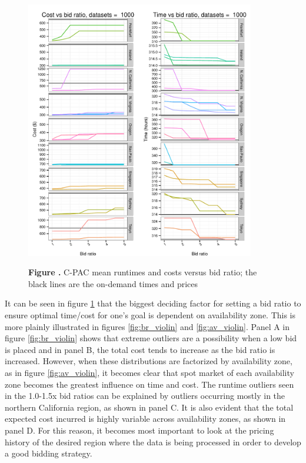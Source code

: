 \documentclass{frontiersSCNS} %
\begin{document}
\begin{figure}[!ht]
\begin{center}
\includegraphics[width=10cm]{../../spot-model/plots/cpac_sim_mean.pdf}
\end{center}
 \textbf{\label{fig:02} Figure .}{ C-PAC mean runtimes and costs versus bid ratio; the black lines are the on-demand times and prices }
\end{figure}

It can be seen in figure \ref{fig:02} that the biggest deciding factor for setting a bid ratio to ensure optimal time/cost for one's goal is dependent on availability zone. This is more plainly illustrated in figures \ref{fig:br_violin} and \ref{fig:av_violin}. Panel A in figure \ref{fig:br_violin} shows that extreme outliers are a possibility when a low bid is placed and in panel B, the total cost tends to increase as the bid ratio is increased. However, when these distributions are factorized by availability zone, as in figure \ref{fig:av_violin}, it becomes clear that spot market of each availability zone becomes the greatest influence on time and cost. The runtime outliers seen in the 1.0-1.5x bid ratios can be explained by outliers occurring mostly in the northern California region, as shown in panel C. It is also evident that the total expected cost incurred is highly variable across availability zones, as shown in panel D. For this reason, it becomes most important to look at the pricing history of the desired region where the data is being processed in order to develop a good bidding strategy.
\end{document}
